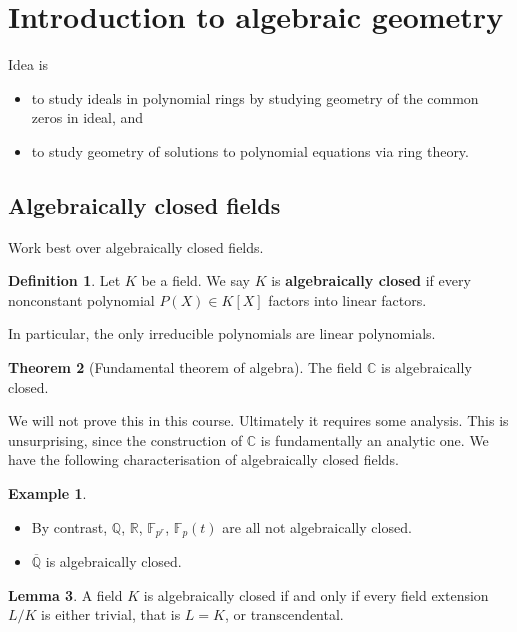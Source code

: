 \documentclass{article}
\newcommand{\F}{\mathbb{F}}
\newcommand{\Q}{\mathbb{Q}}
\newcommand{\R}{\mathbb{R}}
\newcommand{\C}{\mathbb{C}}
\newcommand{\rb}[1]{\left( #1 \right)}
\renewcommand{\sb}[1]{\left[ #1 \right]}
\theoremstyle{definition}\newtheorem{definition}{Definition}[subsection]
\theoremstyle{definition}\newtheorem{remark}[definition]{Remark}
\theoremstyle{definition}\newtheorem*{example}{Example}
\theoremstyle{definition}\newtheorem*{note}{Note}
\newtheorem{lemma}[definition]{Lemma}
\newtheorem{theorem}[definition]{Theorem}
\begin{document}
\section{Introduction to algebraic geometry}

Idea is
\begin{itemize}
\item to study ideals in polynomial rings by studying geometry of the common zeros in ideal, and
\item to study geometry of solutions to polynomial equations via ring theory.
\end{itemize}

\subsection{Algebraically closed fields}

Work best over algebraically closed fields.

\begin{definition}
Let $ K $ be a field. We say $ K $ is \textbf{algebraically closed} if every nonconstant polynomial $ P\rb{X} \in K\sb{X} $ factors into linear factors.
\end{definition}

In particular, the only irreducible polynomials are linear polynomials.

\begin{theorem}[Fundamental theorem of algebra]
The field $ \C $ is algebraically closed.
\end{theorem}

We will not prove this in this course. Ultimately it requires some analysis. This is unsurprising, since the construction of $ \C $ is fundamentally an analytic one. We have the following characterisation of algebraically closed fields.

\begin{example}
\hfill
\begin{itemize}
\item By contrast, $ \Q $, $ \R $, $ \F_{p^r} $, $ \F_p\rb{t} $ are all not algebraically closed.
\item $ \overline{\Q} $ is algebraically closed.
\end{itemize}
\end{example}

\begin{lemma}
A field $ K $ is algebraically closed if and only if every field extension $ L / K $ is either trivial, that is $ L = K $, or transcendental.
\end{lemma}
\end{document}

